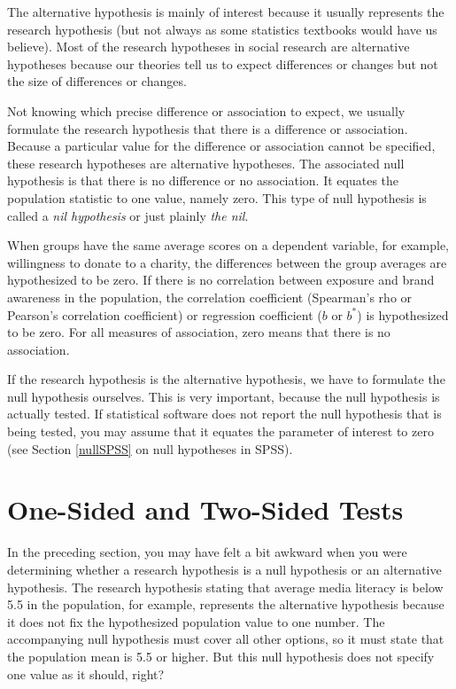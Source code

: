 \documentclass[a4paper]{book}
\theoremstyle{definition}
\theoremstyle{definition}
\theoremstyle{definition}
\theoremstyle{remark}
\begin{document}
The alternative hypothesis is mainly of interest because it usually
represents the research hypothesis (but not always as some statistics
textbooks would have us believe). Most of the research hypotheses in
social research are alternative hypotheses because our theories tell us
to expect differences or changes but not the size of differences or
changes.

Not knowing which precise difference or association to expect, we
usually formulate the research hypothesis that there is a difference or
association. Because a particular value for the difference or
association cannot be specified, these research hypotheses are
alternative hypotheses. The associated null hypothesis is that there is
no difference or no association. It equates the population statistic to
one value, namely zero. This type of null hypothesis is called a
\emph{nil hypothesis} or just plainly \emph{the nil}.

When groups have the same average scores on a dependent variable, for
example, willingness to donate to a charity, the differences between the
group averages are hypothesized to be zero. If there is no correlation
between exposure and brand awareness in the population, the correlation
coefficient (Spearman's rho or Pearson's correlation coefficient) or
regression coefficient (\(b\) or \(b^*\)) is hypothesized to be zero.
For all measures of association, zero means that there is no
association.

If the research hypothesis is the alternative hypothesis, we have to
formulate the null hypothesis ourselves. This is very important, because
the null hypothesis is actually tested. If statistical software does not
report the null hypothesis that is being tested, you may assume that it
equates the parameter of interest to zero (see Section \ref{nullSPSS} on
null hypotheses in SPSS).

\section{One-Sided and Two-Sided Tests}\label{one-twosidedtests}

In the preceding section, you may have felt a bit awkward when you were
determining whether a research hypothesis is a null hypothesis or an
alternative hypothesis. The research hypothesis stating that average
media literacy is below 5.5 in the population, for example, represents
the alternative hypothesis because it does not fix the hypothesized
population value to one number. The accompanying null hypothesis must
cover all other options, so it must state that the population mean is
5.5 or higher. But this null hypothesis does not specify one value as it
should, right?
\end{document}

